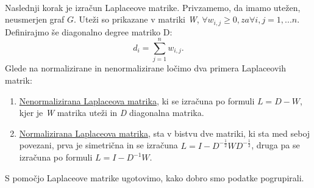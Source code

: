 \documentclass[a4paper, 10pt]{article}
\begin{document}
\\
Naslednji korak je izračun Laplaceove matrike. Privzamemo, da imamo utežen, neusmerjen graf $G$. Uteži so prikazane v matriki \textsl{W}, $\forall w_{i,j} \geq 0, za \forall i,j = 1, ... n$. Definirajmo še diagonalno degree matriko D: $$ d_i = \sum_{j=1}^n w_{i,j}.$$Glede na normalizirane in nenormalizirane ločimo dva primera Laplaceovih matrik:\\
\begin{enumerate}
\item\underline{Nenormalizirana Laplaceova matrika}, ki se izračuna po formuli $L = D - W$, kjer je \textsl{W} matrika uteži in \textsl{D} diagonalna matrika.
\item\underline{Normalizirana Laplaceova matrika}, sta v bistvu dve matriki, ki sta med seboj povezani, prva je simetrična in se izračuna $L = I - D^{-\frac{1}{2}}WD^{-\frac{1}{2}}$, druga pa se izračuna po formuli $L = I - D^{-1}W$.
\end{enumerate}
S pomočjo Laplaceove matrike ugotovimo, kako dobro smo podatke pogrupirali.
\end{document}
